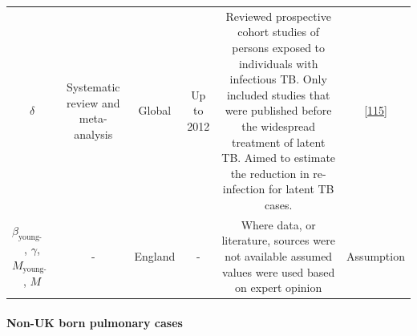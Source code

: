 \documentclass[11pt,twoside]{bristolthesis}
\begin{document}
\begin{longtable}[]{@{}cccccc@{}}
\begin{minipage}[t]{0.19\columnwidth}
  \(\delta\)\strut
  \end{minipage} & \begin{minipage}[t]{0.09\columnwidth}\centering
  Systematic
  review and
  meta-analysis\strut
  \end{minipage} & \begin{minipage}[t]{0.07\columnwidth}\centering
  Global\strut
  \end{minipage} & \begin{minipage}[t]{0.07\columnwidth}\centering
  Up to
  2012\strut
  \end{minipage} & \begin{minipage}[t]{0.31\columnwidth}\centering
  Reviewed prospective cohort studies of persons
  exposed to individuals with infectious TB. Only
  included studies that were published before the
  widespread treatment of latent TB. Aimed to
  estimate the reduction in re-infection for latent
  TB cases.\strut
  \end{minipage} & \begin{minipage}[t]{0.10\columnwidth}\centering
  {[}\protect\hyperlink{ref-Andrews2012}{115}{]}\strut
  \end{minipage}\tabularnewline
  \begin{minipage}[t]{0.19\columnwidth}\centering
  \(\beta_{\text{young-adult}}\),
  \(\gamma\),
  \(M_{\text{young-adult}}\),
  \(M\)\strut
  \end{minipage} & \begin{minipage}[t]{0.09\columnwidth}\centering
  -\strut
  \end{minipage} & \begin{minipage}[t]{0.07\columnwidth}\centering
  England\strut
  \end{minipage} & \begin{minipage}[t]{0.07\columnwidth}\centering
  -\strut
  \end{minipage} & \begin{minipage}[t]{0.31\columnwidth}\centering
  Where data, or literature, sources were not
  available assumed values were used based on expert
  opinion\strut
  \end{minipage} & \begin{minipage}[t]{0.10\columnwidth}\centering
  Assumption\strut
  \end{minipage}\tabularnewline
  \bottomrule
  \end{longtable}
  \hypertarget{non-uk-born-pulmonary-cases}{%
  \paragraph{Non-UK born pulmonary cases}\label{non-uk-born-pulmonary-cases}}
  
\end{document}
